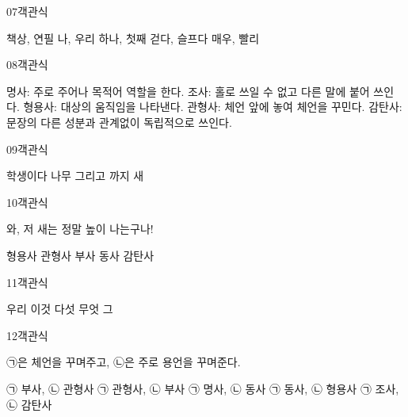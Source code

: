 \documentclass[fs9,seriesRus]{korfarm-base}
\begin{document}
\begin{kfQBlock}{07}{객관식}
\begin{kfChoices}
\kfChoice 책상, 연필
\kfChoice 나, 우리
\kfChoice 하나, 첫째
\kfChoice 걷다, 슬프다
\kfChoice 매우, 빨리
\end{kfChoices}
\end{kfQBlock}
\begin{kfQBlock}{08}{객관식}
\begin{kfChoices}
\kfChoice 명사: 주로 주어나 목적어 역할을 한다.
\kfChoice 조사: 홀로 쓰일 수 없고 다른 말에 붙어 쓰인다.
\kfChoice 형용사: 대상의 움직임을 나타낸다.
\kfChoice 관형사: 체언 앞에 놓여 체언을 꾸민다.
\kfChoice 감탄사: 문장의 다른 성분과 관계없이 독립적으로 쓰인다.
\end{kfChoices}
\end{kfQBlock}
\begin{kfQBlock}{09}{객관식}
\begin{kfChoices}
\kfChoice 학생이다
\kfChoice 나무
\kfChoice 그리고
\kfChoice 까지
\kfChoice 새
\end{kfChoices}
\end{kfQBlock}
\begin{kfQBlock}{10}{객관식}
\begin{kfEvidence}와, 저 새는 정말 높이 나는구나!\end{kfEvidence}
\begin{kfChoices}
\kfChoice 형용사
\kfChoice 관형사
\kfChoice 부사
\kfChoice 동사
\kfChoice 감탄사
\end{kfChoices}
\end{kfQBlock}
\begin{kfQBlock}{11}{객관식}
\begin{kfChoices}
\kfChoice 우리
\kfChoice 이것
\kfChoice 다섯
\kfChoice 무엇
\kfChoice 그
\end{kfChoices}
\end{kfQBlock}
\begin{kfQBlock}{12}{객관식}
\begin{kfEvidence}㉠은 체언을 꾸며주고, ㉡은 주로 용언을 꾸며준다.\end{kfEvidence}
\begin{kfChoices}
\kfChoice ㉠ 부사, ㉡ 관형사
\kfChoice ㉠ 관형사, ㉡ 부사
\kfChoice ㉠ 명사, ㉡ 동사
\kfChoice ㉠ 동사, ㉡ 형용사
\kfChoice ㉠ 조사, ㉡ 감탄사
\end{kfChoices}
\end{kfQBlock}
\end{document}
